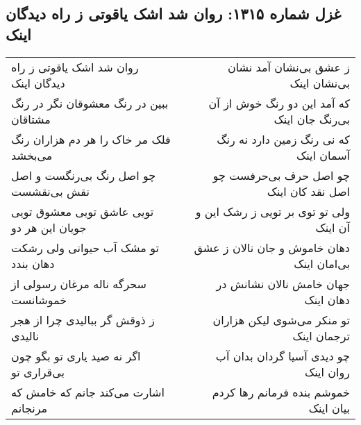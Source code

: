 \begin{center}
\section*{غزل شماره ۱۳۱۵: روان شد اشک یاقوتی ز راه دیدگان اینک}
\label{sec:1315}
\begin{longtable}{l p{0.5cm} r}
روان شد اشک یاقوتی ز راه دیدگان اینک
&&
ز عشق بی‌نشان آمد نشان بی‌نشان اینک
\\
ببین در رنگ معشوقان نگر در رنگ مشتاقان
&&
که آمد این دو رنگ خوش از آن بی‌رنگ جان اینک
\\
فلک مر خاک را هر دم هزاران رنگ می‌بخشد
&&
که نی رنگ زمین دارد نه رنگ آسمان اینک
\\
چو اصل رنگ بی‌رنگست و اصل نقش بی‌نقشست
&&
چو اصل حرف بی‌حرفست چو اصل نقد کان اینک
\\
تویی عاشق تویی معشوق تویی جویان این هر دو
&&
ولی تو توی بر تویی ز رشک این و آن اینک
\\
تو مشک آب حیوانی ولی رشکت دهان بندد
&&
دهان خاموش و جان نالان ز عشق بی‌امان اینک
\\
سحرگه ناله مرغان رسولی از خموشانست
&&
جهان خامش نالان نشانش در دهان اینک
\\
ز ذوقش گر ببالیدی چرا از هجر نالیدی
&&
تو منکر می‌شوی لیکن هزاران ترجمان اینک
\\
اگر نه صید یاری تو بگو چون بی‌قراری تو
&&
چو دیدی آسیا گردان بدان آب روان اینک
\\
اشارت می‌کند جانم که خامش که مرنجانم
&&
خموشم بنده فرمانم رها کردم بیان اینک
\\
\end{longtable}
\end{center}
